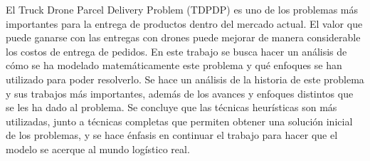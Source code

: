 
El Truck Drone Parcel Delivery Problem (TDPDP) es uno de los problemas más importantes para la entrega de productos dentro del mercado actual. El valor que puede ganarse con las entregas con drones puede mejorar de manera considerable los costos de entrega de pedidos. En este trabajo se busca hacer un análisis de cómo se ha modelado matemáticamente este problema y qué enfoques se han utilizado para poder resolverlo. Se hace un análisis de la historia de este problema y sus trabajos más importantes, además de los avances y enfoques distintos que se les ha dado al problema. Se concluye que las técnicas heurísticas son más utilizadas, junto a técnicas completas que permiten obtener una solución inicial de los problemas, y se hace énfasis en continuar el trabajo para hacer que el modelo se acerque al mundo logístico real.

